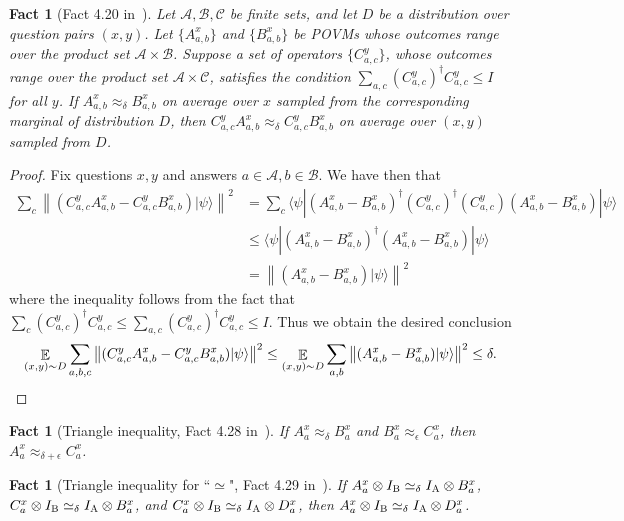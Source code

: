 \documentclass[11pt]{article}
\newtheorem{fact}[theorem]{Fact}
\theoremstyle{definition}
\newcommand{\ket}[1]{|#1\rangle}
\newcommand{\bra}[1]{\langle#1|}
\newcommand{\Id}{\ensuremath{I}}
\newcommand{\E}{\mathop{\mathbb{E}}\displaylimits} %
\newcommand{\labelstyle}[1]{\ensuremath{\textsc{#1}}\xspace}
\newcommand{\alice}{\labelstyle{A}}
\newcommand{\bob}{\labelstyle{B}}
\renewcommand{\cal}[1]{\mathcal{#1}}
\begin{document}
\begin{fact}[Fact 4.20 in~\cite{NW19}]
  \label{fact:add-a-proj}
  Let $\cal{A},\cal{B},\cal{C}$ be finite sets, and let $D$ be a distribution over question pairs $(x,y)$. Let $\{A_{a,b}^x\}$ and $\{B_{a,b}^x\}$ be POVMs whose outcomes range over the product set $\cal{A} \times \cal{B}$. 
  Suppose a set of operators $\{C_{a,c}^y\}$, whose outcomes range over the product set $\cal{A} \times \cal{C}$, satisfies the condition $\sum_{a,c} (C_{a,c}^y)^\dagger
  C_{a,c}^y \leq \Id$ for all $y$.
  If $A_{a,b}^x \approx_\delta B_{a,b}^x$ on average over $x$ sampled from the corresponding marginal of distribution $D$, then $C^y_{a,c} A^x_{a,b} \approx_\delta C^y_{a,c}
  B^x_{a,b}$ on average over $(x,y)$ sampled from $D$. 
\end{fact}
\begin{proof}
Fix questions $x,y$ and answers $a \in \cal{A},b \in \cal{B}$. We have then that
\begin{align}
\sum_{c} \left \| (C^y_{a,c} A^x_{a,b} - C^y_{a,c} B^x_{a,b} ) \ket{\psi} \right \|^2 &= 
\sum_{c} \bra{\psi} (A^x_{a,b} - B^x_{a,b})^\dagger (C^y_{a,c})^\dagger (C^y_{a,c}) (A^x_{a,b} - B^x_{a,b} ) \ket{\psi}	\\
&\leq \bra{\psi} (A^x_{a,b} - B^x_{a,b})^\dagger (A^x_{a,b} - B^x_{a,b} ) \ket{\psi} \\
&= \left \| (A^x_{a,b} - B^x_{a,b})\ket{\psi} \right \|^2
\end{align}
where the inequality follows from the fact that $\sum_c (C_{a,c}^y)^\dagger
  C_{a,c}^y \leq \sum_{a,c} (C_{a,c}^y)^\dagger
  C_{a,c}^y \leq \Id$. Thus we obtain the desired conclusion
 \begin{equation}
\E_{(x,y) \sim D} \sum_{a,b,c} \left \| (C^y_{a,c} A^x_{a,b} - C^y_{a,c} B^x_{a,b} ) \ket{\psi} \right \|^2 	\leq \E_{(x,y) \sim D} \sum_{a,b} \left \| (A^x_{a,b} - B^x_{a,b})\ket{\psi} \right \|^2 \leq \delta.
 \end{equation}
\end{proof}

\begin{fact}[Triangle inequality, Fact 4.28 in~\cite{NW19}]
  \label{fact:triangle}
  If $A_a^x \approx_\delta B_a^x$ and $B_a^x \approx_\epsilon C_a^x$, then
  $A_a^x \approx_{\delta + \epsilon} C_a^x$.
\end{fact}

\begin{fact}[Triangle inequality for ``$\simeq$", Fact 4.29 in~\cite{NW19}]
  \label{fact:triangle-for-simeq}
  If $A_a^x \otimes I_\bob \simeq_\delta I_\alice \otimes B_a^x$,
  $C_a^x \otimes I_\bob \simeq_\delta I_\alice \otimes  B_a^x$,
  and $C_a^x \otimes I_\bob \simeq_\delta I_\alice \otimes  D_a^x$,
  then $A_a^x \otimes I_\bob \simeq_\delta I_\alice \otimes  D_a^x$.
\end{fact}
\end{document}
